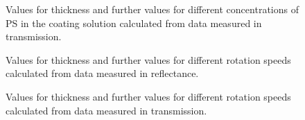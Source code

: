 \begin{figure}[h]
    
    \caption{Values for thickness and further values for different concentrations of PS in the coating solution calculated from data measured in transmission.}
    \label{tab:ConcThickTrans}
\end{figure}

\begin{figure}[h]
    
    \caption{Values for thickness and further values for different rotation speeds calculated from data measured in reflectance.}
    \label{tab:RotThickRef}
\end{figure}

\begin{figure}[h]
    
    \caption{Values for thickness and further values for different rotation speeds calculated from data measured in transmission.}
    \label{tab:RotThickTrans}
\end{figure}